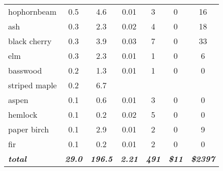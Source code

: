 \documentclass[landscape]{article}
\begin{document}
\begin{table}[H]
\begin{tabular}[t]{lcccccc}
hophornbeam & 0.5 & 4.6 & 0.01 & 3 & 0 & 16\\
 
\rowcolor{gray!6}  ash & 0.3 & 2.3 & 0.02 & 4 & 0 & 18\\
 
black cherry & 0.3 & 3.9 & 0.03 & 7 & 0 & 33\\
 
\rowcolor{gray!6}  elm & 0.3 & 2.3 & 0.01 & 1 & 0 & 6\\
 
basswood & 0.2 & 1.3 & 0.01 & 1 & 0 & 0\\
 
\rowcolor{gray!6}  striped maple & 0.2 & 6.7 &  &  &  & \\
 
aspen & 0.1 & 0.6 & 0.01 & 3 & 0 & 0\\
 
\rowcolor{gray!6}  hemlock & 0.1 & 0.2 & 0.02 & 5 & 0 & 0\\
 
paper birch & 0.1 & 2.9 & 0.01 & 2 & 0 & 9\\
 
\rowcolor{gray!6}  fir & 0.1 & 0.2 & 0.01 & 2 & 0 & 0\\
 
\rowcolor[HTML]{DCDCDC}  \em{\textbf{total}} & \em{\textbf{29.0}} & \em{\textbf{196.5}} & \em{\textbf{2.21}} & \em{\textbf{491}} & \em{\textbf{\$11}} & \em{\textbf{\$2397}}\\
\bottomrule
\end{tabular}
\end{table}
\end{document}
